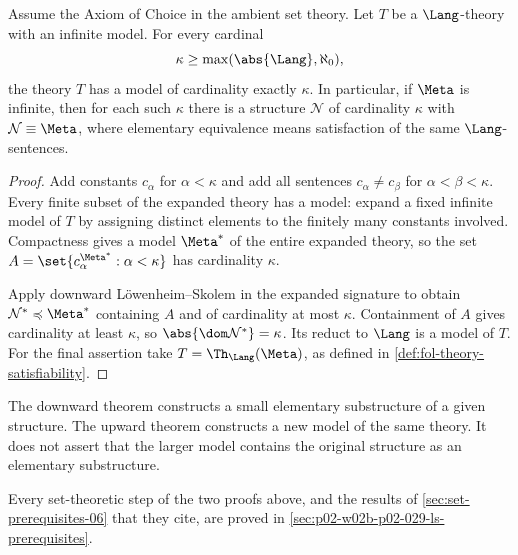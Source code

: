 \begin{theorem}
\label{thm:upward-ls}
Assume the Axiom of Choice in the ambient set theory.  Let \(T\) be a
\(\Lang\)-theory with an infinite model.  For every cardinal
\[
 \kappa\geq\max(\abs{\Lang},\aleph_0),
\]
the theory \(T\) has a model of cardinality exactly \(\kappa\).  In
particular, if \(\Meta\) is infinite, then for each such \(\kappa\) there is
a structure \(\mathcal N\) of cardinality \(\kappa\) with
\(\mathcal N\equiv\Meta\), where elementary equivalence means satisfaction of
the same \(\Lang\)-sentences.
\end{theorem}
\begin{proof}
Add constants \(c_\alpha\) for \(\alpha<\kappa\) and add all sentences
\(c_\alpha\ne c_\beta\) for \(\alpha<\beta<\kappa\).  Every finite subset of
the expanded theory has a model: expand a fixed infinite model of \(T\) by
assigning distinct elements to the finitely many constants involved.
Compactness gives a model \(\Meta^*\) of the entire expanded theory, so the
set
\(A=\set{c_\alpha^{\Meta^*}:\alpha<\kappa}\) has cardinality \(\kappa\).

Apply downward L\"owenheim--Skolem in the expanded signature to obtain
\(\mathcal N^*\preccurlyeq\Meta^*\) containing \(A\) and of cardinality at
most \(\kappa\).  Containment of \(A\) gives cardinality at least \(\kappa\),
so \(\abs{\dom\mathcal N^*}=\kappa\).  Its reduct to \(\Lang\) is a model
 of \(T\).  For the final assertion take \(T=\Th_{\Lang}(\Meta)\), as
defined in \cref{def:fol-theory-satisfiability}.
\end{proof}

The downward theorem constructs a small elementary substructure of a given
structure.  The upward theorem constructs a new model of the same theory.  It
does not assert that the larger model contains the original structure as an
elementary substructure.

Every set-theoretic step of the two proofs above, and the results of
\cref{sec:set-prerequisites-06} that they cite, are proved in
\cref{sec:p02-w02b-p02-029-ls-prerequisites}.

